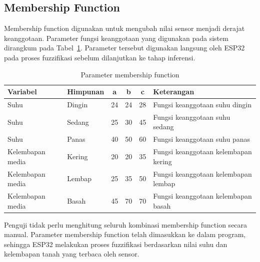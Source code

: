 \documentclass[12pt,a4paper]{article}
\begin{document}
\subsection{Membership Function}

Membership function digunakan untuk mengubah nilai sensor menjadi derajat keanggotaan. Parameter fungsi keanggotaan yang digunakan pada sistem dirangkum pada Tabel~\ref{tab:mf}. Parameter tersebut digunakan langsung oleh ESP32 pada proses fuzzifikasi sebelum dilanjutkan ke tahap inferensi.

\begin{table}[H]
    \centering
    \caption{Parameter membership function}
    \label{tab:mf}
    \small
    \begin{tabularx}{\textwidth}{l l c c c X}
        \toprule
        \textbf{Variabel} &
        \textbf{Himpunan} &
        \textbf{a} &
        \textbf{b} &
        \textbf{c} &
        \textbf{Keterangan} \\
        \midrule

        Suhu & Dingin &
        24 &
        24 &
        28 &
        Fungsi keanggotaan suhu dingin \\

        Suhu & Sedang &
        25 &
        30 &
        45 &
        Fungsi keanggotaan suhu sedang \\

        Suhu & Panas &
        40 &
        50 &
        60 &
        Fungsi keanggotaan suhu panas \\

        \addlinespace
        Kelembapan media & Kering &
        20 &
        20 &
        35 &
        Fungsi keanggotaan kelembapan kering \\

        Kelembapan media & Lembap &
        25 &
        35 &
        50 &
        Fungsi keanggotaan kelembapan lembap \\

        Kelembapan media & Basah &
        45 &
        70 &
        70 &
        Fungsi keanggotaan kelembapan basah \\

        \bottomrule
    \end{tabularx}
\end{table}

Penguji tidak perlu menghitung seluruh kombinasi membership function secara manual. Parameter membership function telah dimasukkan ke dalam program, sehingga ESP32 melakukan proses fuzzifikasi berdasarkan nilai suhu dan kelembapan tanah yang terbaca oleh sensor.
\end{document}
